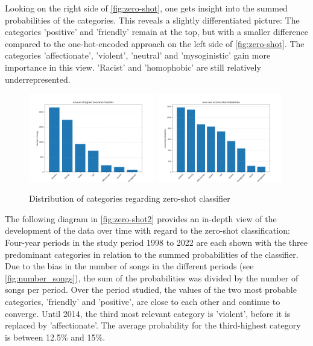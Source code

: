 Looking on the right side of \autoref{fig:zero-shot}, one gets insight into the summed probabilities of the categories. This reveals a slightly differentiated picture: The categories 'positive' and 'friendly' remain at the top, but with a smaller difference compared to the one-hot-encoded approach on the left side of \autoref{fig:zero-shot}. The categories 'affectionate', 'violent', 'neutral' and 'mysoginistic' gain more importance in this view. 'Racist' and 'homophobic' are still relatively underrepresented.


\begin{figure}[!htb]
    \centering
    \includegraphics[width=0.49\textwidth]{figures/overall_score_binary_zero_shot.png}
    \includegraphics[width=0.49\textwidth]{figures/overall_score_zero_shot.png}
    \caption{Distribution of categories regarding zero-shot classifier}
    \label{fig:zero-shot}
\end{figure}

The following diagram in \autoref{fig:zero-shot2} provides an in-depth view of the development of the data over time with regard to the zero-shot classification: Four-year periods in the study period 1998 to 2022 are each shown with the three predominant categories in relation to the summed probabilities of the classifier. Due to the bias in the number of songs in the different periods (see \autoref{fig:number_songs}), the sum of the probabilities was divided by the number of songs per period. Over the period studied, the values of the two most probable categories, 'friendly' and 'positive', are close to each other and continue to converge. Until 2014, the third most relevant category is 'violent', before it is replaced by 'affectionate'. The average probability for the third-highest category is between 12.5\% and 15\%. 

